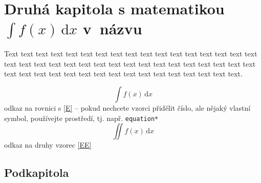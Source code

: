 \chapter{Druhá kapitola s matematikou \texorpdfstring{$\int\! f(x)\,\mathrm{d}x$}{int f(x) dx} v~názvu}

% 
% 
% 
% 
% 

Text text  text  text  text  text  text  text  text  text  text  text  text  text  text  text  text  text  text  text 
text  text  text  text  text  text  text  text  text  text  text  text  text  text  text  text  text  text  text  text 
text  text  text  text  text  text  text  text  text  text.

\begin{equation*}\label{E}\tag{rovnice}
 \int\! f(x)\,\mathrm{d}x
\end{equation*}
odkaz na rovnici s  \eqref{E} -- pokud nechcete vzorci přidělit číslo, ale nějaký vlastní symbol, používejte
 prostředí, tj. např. \verb+equation*+
\begin{equation}\label{EE}
 \iint\! f(x)\,\mathrm{d}x
\end{equation}
odkaz na druhy vzorec \eqref{EE}

\lipsum[1]

\shorthandoff{-} 
\lipsum[9-14]
\lipsum[35-41]

\section{Podkapitola}

\lipsum[50-53]
\shorthandon{-} 

